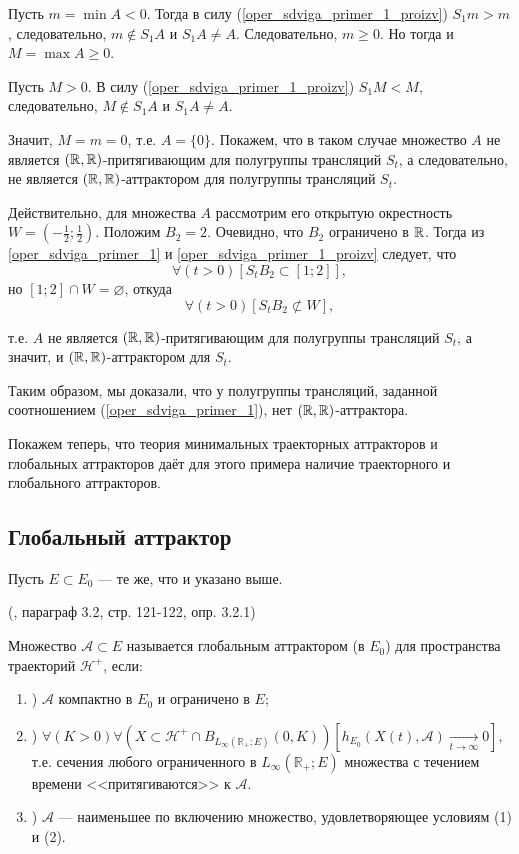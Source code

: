 Пусть $m = \min A < 0$.
Тогда в силу (\ref{oper_sdviga_primer_1_proizv}) $S_1 m > m$, следовательно, $m \notin S_1 A$ и $S_1 A \neq A$.
Следовательно, $m \geq 0$.
Но тогда и $M = \max A \geq 0$.

Пусть $M > 0$.
В силу (\ref{oper_sdviga_primer_1_proizv}) $S_1 M < M$, следовательно, $M \notin S_1 A$ и $S_1 A \neq A$.

Значит, $M=m=0$, т.е. $A=\{0\}$.
Покажем, что в таком случае множество $A$ не является $(\mathbb{R},\mathbb{R})$-притягивающим для полугруппы трансляций $S_t$, а следовательно, не является $(\mathbb{R},\mathbb{R})$-аттрактором для полугруппы трансляций $S_t$.

Действительно, для множества $A$ рассмотрим его открытую окрестность $ W = (-\frac12;\frac12)$.
Положим $B_2={2}$.
Очевидно, что $B_2$ ограничено в $\mathbb{R}$.
Тогда из \ref{oper_sdviga_primer_1} и \ref{oper_sdviga_primer_1_proizv} следует, что
$$
	\forall(t>0)[S_t B_2 \subset [1; 2]],
$$
но $[1;2]\cap W = \varnothing$, откуда
$$
	\forall(t>0)[S_t B_2 \not\subset W],
$$

т.е. $A$ не является $(\mathbb{R},\mathbb{R})$-притягивающим для полугруппы трансляций $S_t$,
а значит, и $(\mathbb{R},\mathbb{R})$-аттрактором для $S_t$.

Таким образом, мы доказали, что у полугруппы трансляций, заданной соотношением (\ref{oper_sdviga_primer_1}),
нет $(\mathbb{R},\mathbb{R})$-аттрактора.

Покажем теперь, что теория минимальных траекторных аттракторов и глобальных аттракторов
даёт для этого примера наличие траекторного и глобального аттракторов.


\subsection*{Глобальный аттрактор}

Пусть $E\subset E_0$ --- те же, что и указано выше.

\opred (\cite{Zelenaya}, параграф 3.2, стр. 121-122, опр. 3.2.1)

Множество  $\mathcal{A} \subset E $ называется глобальным аттрактором (в $E_0$) для пространства траекторий $\mathcal{H}^+$, если:
\begin{enumerate}
	\item)
		$\mathcal{A}$ компактно в $E_0$ и ограничено в $E$;
	\item)
		$
			\forall(K>0)\forall(X \subset \mathcal{H}^+ \cap B_{L_{\infty}\left( \mathbb{R}_+; E \right)}(0,K))
				\left[
					h_{E_0}(X(t),\mathcal{A}) \xrightarrow[t\to \infty]{}{0}
				\right],
		$
		т.е. сечения любого ограниченного в $L_{\infty}\left( \mathbb{R}_+; E \right)$ множества
		с течением времени <<притягиваются>> к $\mathcal{A}$.
	\item)
		$\mathcal{A}$ --- наименьшее по включению множество, удовлетворяющее условиям (1) и (2).
\end{enumerate}


